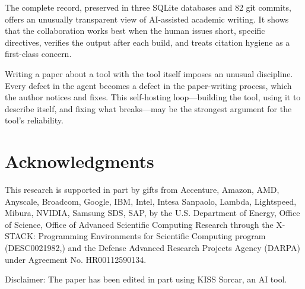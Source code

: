 \documentclass{article}
\begin{document}
The complete record, preserved in three SQLite databases and 82 git commits, offers an unusually transparent view of AI-assisted academic writing.  It shows that the collaboration works best when the human issues short, specific directives, verifies the output after each build, and treats citation hygiene as a first-class concern.

Writing a paper about a tool with the tool itself imposes an unusual discipline.  Every defect in the agent becomes a defect in the paper-writing process, which the author notices and fixes.  This self-hosting loop---building the tool, using it to describe itself, and fixing what breaks---may be the strongest argument for the tool's reliability.

\section*{Acknowledgments}

This research is supported in part by gifts from Accenture, Amazon, AMD, Anyscale, Broadcom, Google, IBM, Intel, Intesa Sanpaolo, Lambda, Lightspeed, Mibura, NVIDIA, Samsung SDS, SAP, by the U.S. Department of Energy, Office of Science, Office of Advanced Scientific Computing Research through the X-STACK: Programming Environments for Scientific Computing program (DESC0021982,) and the Defense Advanced Research Projects Agency (DARPA) under Agreement No. HR00112590134.

Disclaimer: The paper has been edited in part using KISS Sorcar, an AI tool.



\end{document}
